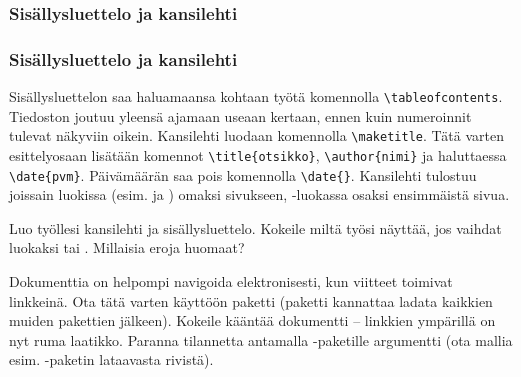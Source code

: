 \subsubsection{Sisällysluettelo ja kansilehti}
\begin{fframe}
    \frametitle{Sisällysluettelo ja kansilehti}
    Sisällysluettelon saa haluamaansa kohtaan työtä komennolla \lstinline-\tableofcontents-. Tiedoston joutuu yleensä ajamaan useaan kertaan, ennen kuin numeroinnit tulevat näkyviin oikein.
    \vaihto
    Kansilehti luodaan komennolla \lstinline-\maketitle-. Tätä varten esittelyosaan lisätään komennot \lstinline-\title{otsikko}-, \lstinline-\author{nimi}- ja haluttaessa \lstinline-\date{pvm}-. Päivämäärän saa pois komennolla \lstinline-\date{}-.
    \vaihto
    Kansilehti tulostuu joissain luokissa (esim.  ja ) omaksi sivukseen, -luokassa osaksi ensimmäistä sivua.
\end{fframe}

\begin{fframe}
    \begin{harj}
        Luo työllesi kansilehti ja sisällysluettelo. Kokeile miltä työsi näyttää, jos vaihdat luokaksi  tai . Millaisia eroja huomaat? 
    \end{harj}
    \begin{harj}
        Dokumenttia on helpompi navigoida elektronisesti, kun viitteet toimivat linkkeinä. Ota tätä varten käyttöön paketti  (paketti kannattaa ladata kaikkien muiden pakettien jälkeen). Kokeile kääntää dokumentti -- linkkien ympärillä on nyt ruma laatikko. Paranna tilannetta antamalla -paketille argumentti  (ota mallia esim. -paketin lataavasta rivistä).
    \end{harj}
\end{fframe}

